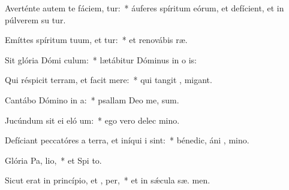 \item Averténte autem te fáciem, tur:~* áuferes spíritum eórum, et defícient, et in púlverem su tur.
\item Emíttes spíritum tuum, et tur:~* et renovábis  ræ.
\item Sit glória Dómi  culum:~* lætábitur Dóminus in o is:
\item Qui réspicit terram, et facit  mere:~* qui tangit ,  migant.
\item Cantábo Dómino in  a:~* psallam Deo me,  sum.
\item Jucúndum sit ei eló um:~* ego vero delec  mino.
\item Defíciant peccatóres a terra, et iníqui i   sint:~* bénedic, áni , mino.
\item Glória Pa,  lio,~* et Spi to.
\item Sicut erat in princípio, et ,  per,~* et in sǽcula sæ. men.
